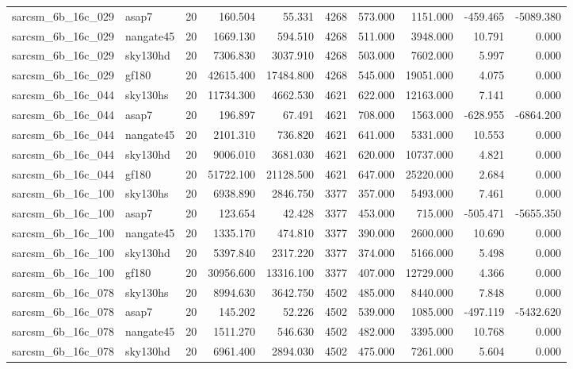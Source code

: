 \begin{longtable}{llrrrrrrrr}
sarcsm\_6b\_16c\_029 & asap7 & 20 & 160.504 & 55.331 & 4268 & 573.000 & 1151.000 & -459.465 & -5089.380 \\
sarcsm\_6b\_16c\_029 & nangate45 & 20 & 1669.130 & 594.510 & 4268 & 511.000 & 3948.000 & 10.791 & 0.000 \\
sarcsm\_6b\_16c\_029 & sky130hd & 20 & 7306.830 & 3037.910 & 4268 & 503.000 & 7602.000 & 5.997 & 0.000 \\
sarcsm\_6b\_16c\_029 & gf180 & 20 & 42615.400 & 17484.800 & 4268 & 545.000 & 19051.000 & 4.075 & 0.000 \\
sarcsm\_6b\_16c\_044 & sky130hs & 20 & 11734.300 & 4662.530 & 4621 & 622.000 & 12163.000 & 7.141 & 0.000 \\
sarcsm\_6b\_16c\_044 & asap7 & 20 & 196.897 & 67.491 & 4621 & 708.000 & 1563.000 & -628.955 & -6864.200 \\
sarcsm\_6b\_16c\_044 & nangate45 & 20 & 2101.310 & 736.820 & 4621 & 641.000 & 5331.000 & 10.553 & 0.000 \\
sarcsm\_6b\_16c\_044 & sky130hd & 20 & 9006.010 & 3681.030 & 4621 & 620.000 & 10737.000 & 4.821 & 0.000 \\
sarcsm\_6b\_16c\_044 & gf180 & 20 & 51722.100 & 21128.500 & 4621 & 647.000 & 25220.000 & 2.684 & 0.000 \\
sarcsm\_6b\_16c\_100 & sky130hs & 20 & 6938.890 & 2846.750 & 3377 & 357.000 & 5493.000 & 7.461 & 0.000 \\
sarcsm\_6b\_16c\_100 & asap7 & 20 & 123.654 & 42.428 & 3377 & 453.000 & 715.000 & -505.471 & -5655.350 \\
sarcsm\_6b\_16c\_100 & nangate45 & 20 & 1335.170 & 474.810 & 3377 & 390.000 & 2600.000 & 10.690 & 0.000 \\
sarcsm\_6b\_16c\_100 & sky130hd & 20 & 5397.840 & 2317.220 & 3377 & 374.000 & 5166.000 & 5.498 & 0.000 \\
sarcsm\_6b\_16c\_100 & gf180 & 20 & 30956.600 & 13316.100 & 3377 & 407.000 & 12729.000 & 4.366 & 0.000 \\
sarcsm\_6b\_16c\_078 & sky130hs & 20 & 8994.630 & 3642.750 & 4502 & 485.000 & 8440.000 & 7.848 & 0.000 \\
sarcsm\_6b\_16c\_078 & asap7 & 20 & 145.202 & 52.226 & 4502 & 539.000 & 1085.000 & -497.119 & -5432.620 \\
sarcsm\_6b\_16c\_078 & nangate45 & 20 & 1511.270 & 546.630 & 4502 & 482.000 & 3395.000 & 10.768 & 0.000 \\
sarcsm\_6b\_16c\_078 & sky130hd & 20 & 6961.400 & 2894.030 & 4502 & 475.000 & 7261.000 & 5.604 & 0.000 \\

\end{longtable}
